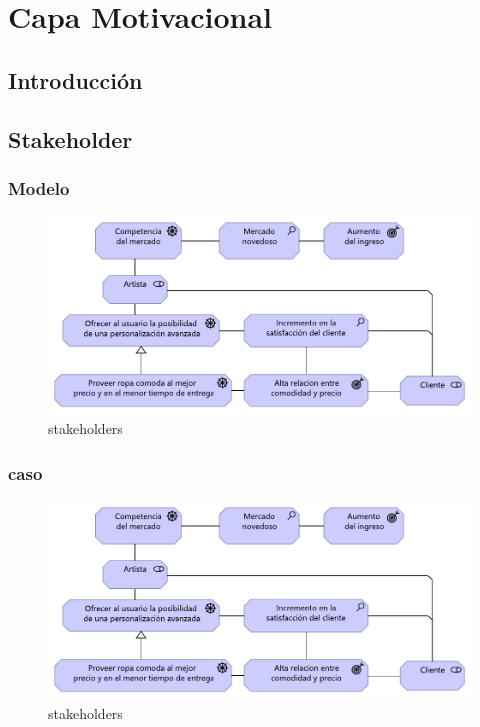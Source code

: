 \graphicspath{{./2-Arquitectura/capitulo3/}}

\chapter{Capa Motivacional}
\section{Introducción}
\newpage
\section{Stakeholder}
\subsection{Modelo}
\begin{figure}[h!]
	\centering
	\includegraphics[width=0.7\linewidth]{imgs/stakeholders}
	\caption{stakeholders}
	\label{fig:stakeholders}
\end{figure}
\newpage
\subsection{caso}
\begin{figure}[h!]
	\centering
	\includegraphics[width=0.7\linewidth]{imgs/stakeholders}
	\caption{stakeholders}
	\label{fig:stakeholders}
\end{figure}
\newpage
